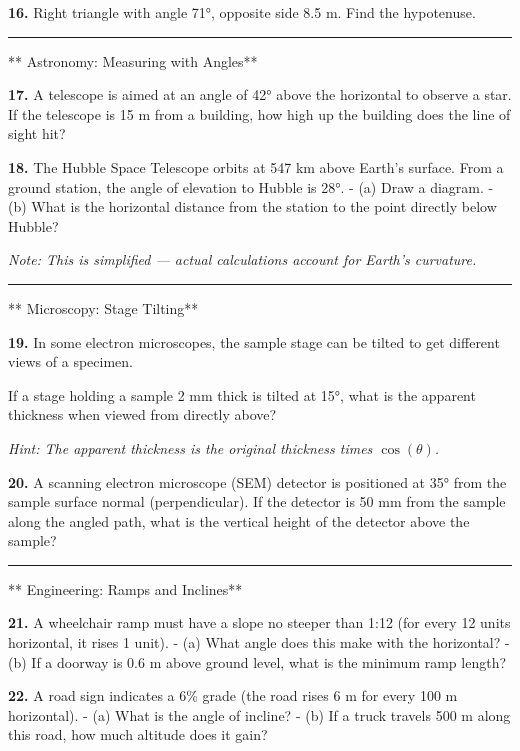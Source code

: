 \documentclass[
  11pt,
]{article}
\begin{document}
\textbf{16.} Right triangle with angle 71°, opposite side 8.5 m. Find
the hypotenuse.

\begin{center}\rule{0.5\linewidth}{0.5pt}\end{center}

** Astronomy: Measuring with Angles**

\textbf{17.} A telescope is aimed at an angle of 42° above the
horizontal to observe a star. If the telescope is 15 m from a building,
how high up the building does the line of sight hit?

\textbf{18.} The Hubble Space Telescope orbits at 547 km above Earth's
surface. From a ground station, the angle of elevation to Hubble is 28°.
- (a) Draw a diagram. - (b) What is the horizontal distance from the
station to the point directly below Hubble?

\emph{Note: This is simplified --- actual calculations account for
Earth's curvature.}

\begin{center}\rule{0.5\linewidth}{0.5pt}\end{center}

** Microscopy: Stage Tilting**

\textbf{19.} In some electron microscopes, the sample stage can be
tilted to get different views of a specimen.

If a stage holding a sample 2 mm thick is tilted at 15°, what is the
apparent thickness when viewed from directly above?

\emph{Hint: The apparent thickness is the original thickness times
\(\cos(\theta)\).}

\textbf{20.} A scanning electron microscope (SEM) detector is positioned
at 35° from the sample surface normal (perpendicular). If the detector
is 50 mm from the sample along the angled path, what is the vertical
height of the detector above the sample?

\begin{center}\rule{0.5\linewidth}{0.5pt}\end{center}

** Engineering: Ramps and Inclines**

\textbf{21.} A wheelchair ramp must have a slope no steeper than 1:12
(for every 12 units horizontal, it rises 1 unit). - (a) What angle does
this make with the horizontal? - (b) If a doorway is 0.6 m above ground
level, what is the minimum ramp length?

\textbf{22.} A road sign indicates a 6\% grade (the road rises 6 m for
every 100 m horizontal). - (a) What is the angle of incline? - (b) If a
truck travels 500 m along this road, how much altitude does it gain?
\end{document}
